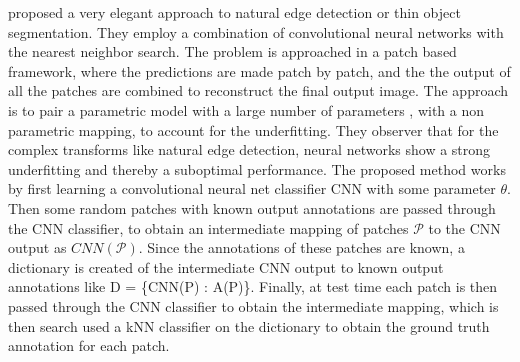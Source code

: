 \citet{ganin2014n} proposed a very elegant approach to natural edge detection or thin object segmentation. They employ a combination of convolutional neural networks with the nearest neighbor search. The problem is approached in a patch based framework, where the predictions are made patch by patch, and the the output of all the patches are combined to reconstruct the final output image. The approach is to pair a parametric model with a large number of parameters , with a non parametric mapping, to account for the underfitting. They observer that for the complex transforms like natural edge detection, neural networks show a strong underfitting and thereby a suboptimal performance. The proposed method works by first learning a convolutional neural net classifier CNN with some parameter $\theta$. Then some random patches with known output annotations are passed through the CNN classifier, to obtain an intermediate mapping of patches $\mathcal{P}$ to the CNN output as $CNN(\mathcal{P})$. Since the annotations of these patches are known, a dictionary is created of the intermediate CNN output to known output annotations like D = \{CNN(P) : A(P)\}. 
Finally, at test time each patch is then passed through the CNN classifier to obtain the intermediate mapping, which is then search used a kNN classifier on the dictionary to obtain the ground truth annotation for each patch.